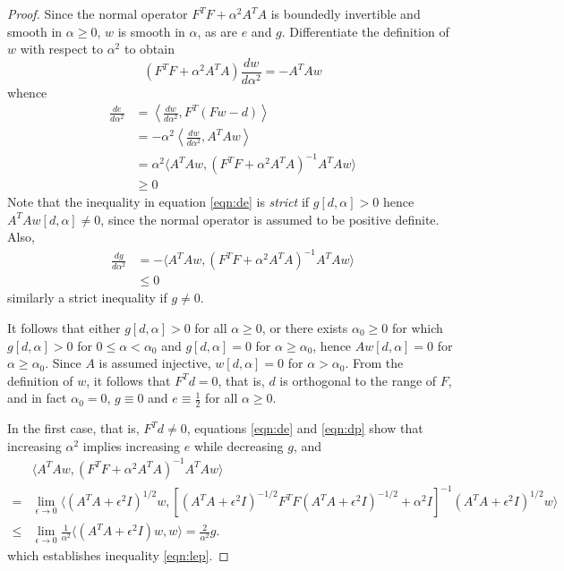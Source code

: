 \begin{proof}
Since the normal operator $F^T F + \alpha^2 A^T A$ is boundedly invertible and smooth in $\alpha \ge 0$, $w$ is smooth in $\alpha$, as are $e$ and $g$. 
Differentiate the definition of $w$ 
with respect to  $\alpha^2$ to obtain
\begin{equation}
(F^T F + \alpha^2 A^T A ) \frac{dw}{d\alpha^2} = -A^T A w
\label{eqn:dnorm}
\end{equation}
whence
\begin{align}
\frac{de}{d\alpha^2} 
&=\left\langle\frac{dw}{d\alpha^2},F^T(Fw-d) \right\rangle \nonumber \\
&=-\alpha^2\left\langle\frac{dw}{d\alpha^2},A^TAw\right\rangle \nonumber \\ 
&=\alpha^2 \langle A^TAw,(F^TF + \alpha^2 A^TA)^{-1}A^TAw\rangle \nonumber \\
&\ge 0
\label{eqn:de}
\end{align}
Note that the inequality in equation \ref{eqn:de} is {\em strict}  if $g[d,\alpha] > 0$ hence $A^TAw[d,\alpha] \ne 0$, since the normal operator is assumed to be positive definite.
Also,
\begin{align}
\frac{dg}{d\alpha^2} &=  -\langle A^T Aw,(F^TF + \alpha^2 A^TA)^{-1}A^TAw \rangle \nonumber \\
&\leq 0
\label{eqn:dp}
\end{align}
similarly a strict inequality if $g \ne 0$.

It follows that either $g[d,\alpha]>0$ for all $\alpha\ge 0$, or there exists $\alpha_0\ge 0$ for which $g[d,\alpha]>0$ for $0
\le \alpha<\alpha_0$ and $g[d,\alpha]=0$ for $\alpha \ge \alpha_0$, hence $Aw[d,\alpha]=0$ for $\alpha \ge \alpha_0$. Since $A$ is assumed injective, $w[d,\alpha]=0$ for $\alpha > \alpha_0$. From the definition of $w$, it follows that $F^Td=0$, that is, $d$ is orthogonal to the range of $F$, and in fact $\alpha_0=0$, $g \equiv 0$ and $e \equiv \frac{1}{2}$ for all $\alpha\ge 0$. 

In the first case, that is, $F^Td \ne 0$, equations \ref{eqn:de} and \ref{eqn:dp} show that increasing $\alpha^2$ implies increasing $e$ while decreasing $g$, and
\begin{align}
&\langle A^TA w,(F^TF + \alpha^2 A^TA)^{-1} A^TA w \rangle \nonumber \\ 
=& \lim_{\epsilon \rightarrow 0}\langle (A^TA+\epsilon^2I)^{1/2}w,[(A^TA+\epsilon^2I)^{-1/2}F^TF(A^TA+\epsilon^2I)^{-1/2} + \alpha^2 I]^{-1}(A^TA+\epsilon^2I)^{1/2}w \rangle \nonumber \\ 
\le& \lim_{\epsilon \rightarrow 0}\frac{1}{\alpha^2} \langle (A^TA+\epsilon^2I) w, w\rangle = \frac{2}{\alpha^2}g.
\end{align}
which establishes inequality \ref{eqn:lep}.
\end{proof}

